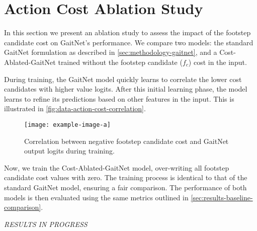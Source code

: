 \section{Action Cost Ablation Study}
\label{sec:results-action-cost-ablation-study}

In this section we present an ablation study to assess the impact of
the footstep candidate cost on GaitNet's performance. We compare two
models: the standard GaitNet formulation as described in
\autoref{sec:methodology-gaitnet}, and a Cost-Ablated-GaitNet trained without
the footstep candidate ($f_c$) cost in the input.

During training, the GaitNet model quickly learns to correlate the
lower cost candidates with higher value logits. After this initial
learning phase, the model learns to refine its predictions based on
other features in the input. This is illustrated in
\autoref{fig:data-action-cost-correlation}.

\begin{figure}[H]
  \centering
  \texttt{[image: example-image-a]}
  \caption{Correlation between negative footstep candidate cost and
  GaitNet output   logits during training.}
  \label{fig:data-action-cost-correlation}
\end{figure}

Now, we train the Cost-Ablated-GaitNet model, over-writing all
footstep candidate cost values with zero. The training process is
identical to that of the standard GaitNet model, ensuring a fair
comparison. The performance of both models is then evaluated using
the same metrics outlined in
\autoref{sec:results-baseline-comparison}.

\textit{RESULTS IN PROGRESS}



